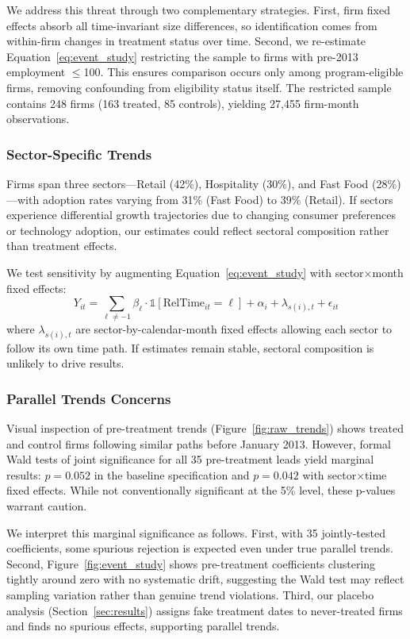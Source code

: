 \documentclass{article}
\begin{document}
We address this threat through two complementary strategies. First, firm fixed effects absorb all time-invariant size differences, so identification comes from within-firm changes in treatment status over time. Second, we re-estimate Equation~\ref{eq:event_study} restricting the sample to firms with pre-2013 employment $\leq$100. This ensures comparison occurs only among program-eligible firms, removing confounding from eligibility status itself. The restricted sample contains 248 firms (163 treated, 85 controls), yielding 27,455 firm-month observations.

\subsubsection{Sector-Specific Trends}

Firms span three sectors—Retail (42\%), Hospitality (30\%), and Fast Food (28\%)—with adoption rates varying from 31\% (Fast Food) to 39\% (Retail). If sectors experience differential growth trajectories due to changing consumer preferences or technology adoption, our estimates could reflect sectoral composition rather than treatment effects.

We test sensitivity by augmenting Equation~\ref{eq:event_study} with sector$\times$month fixed effects:
\begin{equation}
Y_{it} = \sum_{\ell \neq -1} \beta_\ell \cdot \mathbb{1}[\text{RelTime}_{it} = \ell] + \alpha_i + \lambda_{s(i),t} + \epsilon_{it}
\label{eq:sector_time}
\end{equation}
where $\lambda_{s(i),t}$ are sector-by-calendar-month fixed effects allowing each sector to follow its own time path. If estimates remain stable, sectoral composition is unlikely to drive results.

\subsubsection{Parallel Trends Concerns}

Visual inspection of pre-treatment trends (Figure~\ref{fig:raw_trends}) shows treated and control firms following similar paths before January 2013. However, formal Wald tests of joint significance for all 35 pre-treatment leads yield marginal results: $p = 0.052$ in the baseline specification and $p = 0.042$ with sector$\times$time fixed effects. While not conventionally significant at the 5\% level, these p-values warrant caution.

We interpret this marginal significance as follows. First, with 35 jointly-tested coefficients, some spurious rejection is expected even under true parallel trends. Second, Figure~\ref{fig:event_study} shows pre-treatment coefficients clustering tightly around zero with no systematic drift, suggesting the Wald test may reflect sampling variation rather than genuine trend violations. Third, our placebo analysis (Section~\ref{sec:results}) assigns fake treatment dates to never-treated firms and finds no spurious effects, supporting parallel trends.
\end{document}
